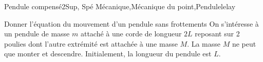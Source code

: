 
\begin{exercise}{Pendule compensé}{2}{Sup, Spé}
{Mécanique,Mécanique du point,Pendule}{lelay}

\begin{questions}
    \questioncours Donner l'équation du mouvement d'un pendule sans frottements
    \question On s'intéresse à un pendule de masse $m$ attaché à une corde de longueur $2L$ reposant sur 2 poulies dont l'autre extrémité est attachée à une masse $M$. La masse $M$ ne peut que monter et descendre. Initialement, la longueur du pendule est $L$.
\end{questions}
\end{exercise}